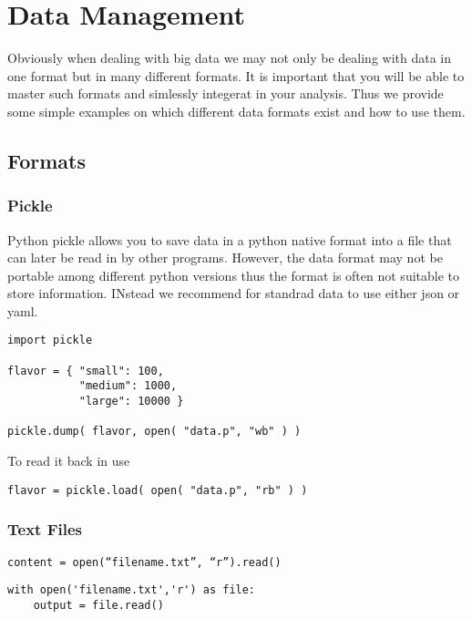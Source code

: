 \FILENAME

\chapter{Data Management}

Obviously when dealing with big data we may not only be dealing with
data in one format but in many different formats. It is important that
you will be able to master such formats and simlessly integerat in
your analysis. Thus we provide some simple examples on which different
data formats exist and how to use them.

\section{Formats}

\subsection{Pickle}

Python pickle allows you to save data in a python native format into a file
that can later be read in by other programs. However, the data format
may not be portable among different python versions thus the format is
often not suitable to store information. INstead we recommend for
standrad data to use either json or yaml.

\begin{verbatim}
import pickle

flavor = { "small": 100, 
           "medium": 1000,
           "large": 10000 }

pickle.dump( flavor, open( "data.p", "wb" ) )

\end{verbatim}

To read it back in use

\begin{verbatim}
flavor = pickle.load( open( "data.p", "rb" ) )
\end{verbatim}

\subsection{Text Files}

\begin{verbatim}
content = open(“filename.txt”, “r”).read() 
\end{verbatim}

\begin{verbatim}
with open('filename.txt','r') as file:
    output = file.read()
\end{verbatim}


